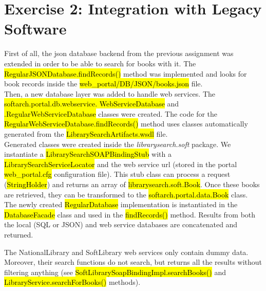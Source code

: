 \section{Exercise 2: Integration with Legacy Software}

First of all, the json database backend from the previous assignment was
extended in order to be able to search for books with it. The
\hl{RegularJSONDatabase.findRecords()} method was implemented and looks for
book records inside the \hl{web\_portal/DB/JSON/books.json} file.\\

Then, a new database layer was added to handle web services. The
\hl{softarch.portal.db.webservice. WebServiceDatabase} and
\hl{.RegularWebServiceDatabase} classes were created. The code for the
\hl{RegularWebServiceDatabase.findRecords()} method uses classes
automatically generated from the \hl{LibrarySearchArtifacts.wsdl} file.\\

Generated classes were created inside the \emph{librarysearch.soft} package. We
instantiate a \hl{LibrarySearchSOAPBindingStub} with a
\hl{LibrarySearchServiceLocator} and the web service url (stored in the portal
\hl{web\_portal.cfg} configuration file). This stub class can process a request
(\hl{StringHolder}) and returns an array of \hl{librarysearch.soft.Book}. Once
these books are retrieved, they can be transformed to the
\hl{softarch.portal.data.Book} class.\\

The newly created \hl{RegularDatabase} implementation is instantiated in
the \hl{DatabaseFacade} class and used in the \hl{findRecords()} method.
Results from both the local (SQL or JSON) and web service databases are
concatenated and returned.\\

\begin{framewarning}
    The NationalLibrary and SoftLibrary web services only contain dummy data.
    Moreover, their search functions do not search, but returns all the results
    without filtering anything (see
    \hl{SoftLibrarySoapBindingImpl.searchBooks()}
    and \hl{LibraryService.searchForBooks()} methods).
\end{framewarning}

\newpage
